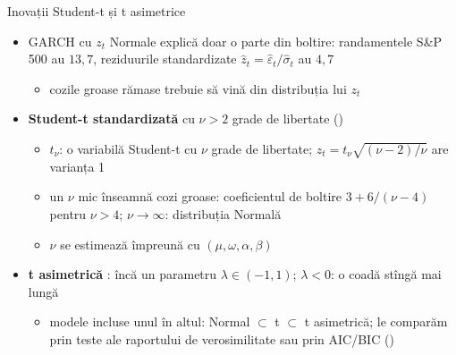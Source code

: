 \begin{frame}{Inovații Student-t și t asimetrice}
\itemsize{\small}
\begin{itemize}
    \item GARCH cu $z_t$ Normale explică doar o parte din boltire: randamentele S\&P 500 au $13{,}7$, reziduurile standardizate $\hat z_t = \hat\varepsilon_t/\hat\sigma_t$ au $4{,}7$
    \begin{itemize}
        \item cozile groase rămase trebuie să vină din distribuția lui $z_t$
    \end{itemize}
    \item \textbf{Student-t standardizată} cu $\nu > 2$ grade de libertate () 
    \begin{itemize}
        \item $t_\nu$: o variabilă Student-t cu $\nu$ grade de libertate; $z_t = t_\nu\sqrt{(\nu - 2)/\nu}$ are varianța 1
        \item un $\nu$ mic înseamnă cozi groase: coeficientul de boltire $3 + 6/(\nu - 4)$ pentru $\nu > 4$; $\nu \to \infty$: distribuția Normală
        \item $\nu$ se estimează împreună cu $(\mu, \omega, \alpha, \beta)$
    \end{itemize}
    \item \textbf{t asimetrică} : încă un parametru $\lambda \in (-1, 1)$; $\lambda < 0$: o coadă stîngă mai lungă
    \begin{itemize}
        \item modele incluse unul în altul: Normal $\subset$ t $\subset$ t asimetrică; le comparăm prin teste ale raportului de verosimilitate sau prin AIC/BIC ()
    \end{itemize}
\end{itemize}
\end{frame}

